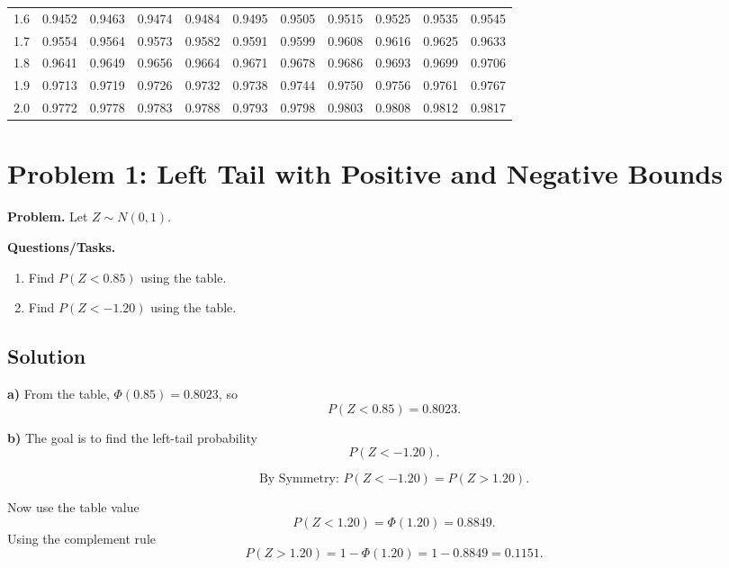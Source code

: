 \begin{center}
\begin{tabular}{c|cccccccccc}
			1.6 & 0.9452 & 0.9463 & 0.9474 & 0.9484 & 0.9495 & 0.9505 & 0.9515 & 0.9525 & 0.9535 & 0.9545 \\
			1.7 & 0.9554 & 0.9564 & 0.9573 & 0.9582 & 0.9591 & 0.9599 & 0.9608 & 0.9616 & 0.9625 & 0.9633 \\
			1.8 & 0.9641 & 0.9649 & 0.9656 & 0.9664 & 0.9671 & 0.9678 & 0.9686 & 0.9693 & 0.9699 & 0.9706 \\
			1.9 & 0.9713 & 0.9719 & 0.9726 & 0.9732 & 0.9738 & 0.9744 & 0.9750 & 0.9756 & 0.9761 & 0.9767 \\
			2.0 & 0.9772 & 0.9778 & 0.9783 & 0.9788 & 0.9793 & 0.9798 & 0.9803 & 0.9808 & 0.9812 & 0.9817 \\
			\bottomrule
		\end{tabular}
	\end{center}
	
	\section{Problem 1: Left Tail with Positive and Negative Bounds}
	\textbf{Problem.} Let \(Z\sim N(0,1)\).
	
	\textbf{Questions/Tasks.}
	\begin{enumerate}[label=\textbf{\alph*)}]
		\item Find \(P(Z<0.85)\) using the table.
		\item Find \(P(Z<-1.20)\) using the table.
	\end{enumerate}
	
	\subsection*{Solution}
	
	\textbf{a)}
	From the table, \(\Phi(0.85)=0.8023\), so
	\[
	P(Z<0.85)=0.8023.
	\]
	
	
	\textbf{b)}
	The goal is to find the left-tail probability
	\[
	P(Z<-1.20).
	\]
	
	
	\[	\text{By Symmetry: } P(Z<-1.20)=P(Z>1.20).	\]
	
	
	Now use the table value
	\[
	P(Z<1.20)=\Phi(1.20)=0.8849.
	\]
	Using the complement rule
	\[
	P(Z>1.20)=1-\Phi(1.20)=1-0.8849=0.1151.
	\]
	
